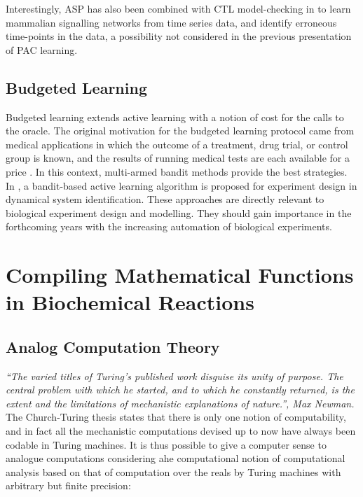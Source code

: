 \documentclass[graybox]{svmult}
\begin{document}
Interestingly, ASP has also been combined with CTL model-checking in \cite{OPSSG16biosystems} to learn mammalian signalling networks from time series data, 
and identify erroneous time-points in the data, a possibility not considered in the previous presentation of PAC learning.


\subsection{Budgeted Learning}\label{budget}

Budgeted learning extends active learning with a notion of cost for the calls to the oracle.
The original motivation for the budgeted learning protocol came from medical applications in which the outcome of a treatment,
drug trial, or control group is known, and the results of running medical tests are each available for a price \cite{DZBSM13ml}.
In this context, multi-armed bandit methods \cite{DBSSZ07icdm} provide the best strategies.
In \cite{LMALS14ecml}, a bandit-based active learning algorithm is proposed for experiment design in dynamical system identification.
These approaches are directly relevant to biological experiment design and modelling. %
They should gain importance in the forthcoming years with the increasing automation of biological experiments.


\section{Compiling Mathematical Functions in Biochemical Reactions}

\subsection{Analog Computation Theory}

\hfill\emph{``The varied titles of Turing's published work disguise its unity of purpose. The central problem with which he started, and to which he constantly returned, is
the extent and the limitations of mechanistic explanations of nature.'', Max Newman.}\\

The Church-Turing thesis states that there is only one notion of computability,
and in fact all the mechanistic computations devised up to now have always been codable in Turing machines.
It is thus possible to give a computer sense to analogue computations considering
ahe computational notion of computational analysis based on that of computation over the reals by Turing machines with arbitrary but finite precision:
\end{document}
